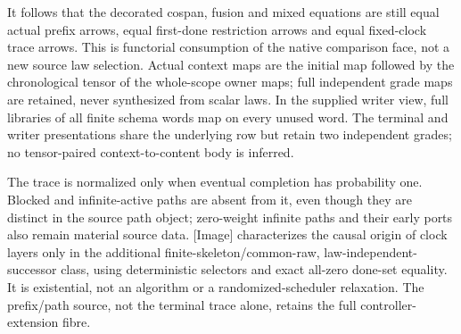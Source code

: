 \documentclass[11pt]{article}
\begin{document}
It follows that the decorated cospan, fusion and mixed equations are still equal actual prefix arrows, equal first-done restriction arrows and equal fixed-clock trace arrows. This is functorial consumption of the native comparison face, not a new source law selection. Actual context maps are the initial map followed by the chronological tensor of the whole-scope owner maps; full independent grade maps are retained, never synthesized from scalar laws. In the supplied writer view, full libraries of all finite schema words map on every unused word. The terminal and writer presentations share the underlying row but retain two independent grades; no tensor-paired context-to-content body is inferred.

The trace is normalized only when eventual completion has probability one. Blocked and infinite-active paths are absent from it, even though they are distinct in the source path object; zero-weight infinite paths and their early ports also remain material source data. [Image] characterizes the causal origin of clock layers only in the additional finite-skeleton/common-raw, law-independent-successor class, using deterministic selectors and exact all-zero done-set equality. It is existential, not an algorithm or a randomized-scheduler relaxation. The prefix/path source, not the terminal trace alone, retains the full controller-extension fibre.
\end{document}
